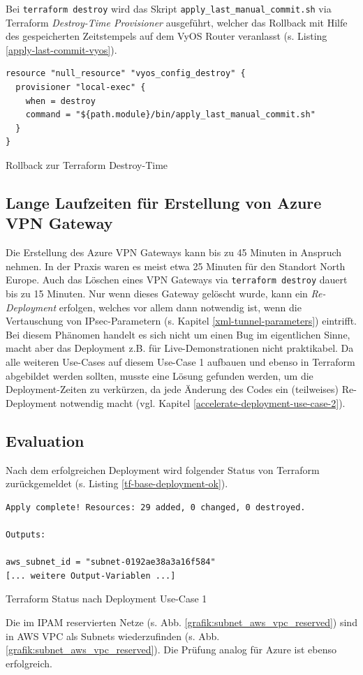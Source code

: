 Bei \texttt{terraform destroy} wird das Skript \texttt{apply\_last\_manual\_commit.sh} via Terraform \textit{Destroy-Time Provisioner} ausgeführt, welcher das Rollback mit Hilfe des gespeicherten Zeitstempels auf dem VyOS Router veranlasst (s. Listing \ref{apply-last-commit-vyos}).
\begin{listing}[h]
\begin{verbatim}
resource "null_resource" "vyos_config_destroy" {
  provisioner "local-exec" {
    when = destroy
    command = "${path.module}/bin/apply_last_manual_commit.sh"
  }
}

\end{verbatim}
\caption{Rollback zur Terraform \glqq Destroy-Time\grqq{}}
\label{apply-last-commit-vyos}
\end{listing}\FloatBarrier
\subsection{Lange Laufzeiten für Erstellung von Azure VPN Gateway}\label{azure-deployment-time}
Die Erstellung des Azure VPN Gateways kann bis zu 45 Minuten in Anspruch nehmen\cite{azurevpndeployment2021}. In der Praxis waren es meist etwa 25 Minuten für den Standort \glqq North Europe\grqq{}. Auch das Löschen eines VPN Gateways via \texttt{terraform destroy} dauert bis zu 15 Minuten. Nur wenn dieses Gateway gelöscht wurde, kann ein \textit{Re-\gls{Deployment}} erfolgen, welches vor allem dann notwendig ist, wenn die Vertauschung von IPsec-Parametern (s. Kapitel \ref{xml-tunnel-parameters}) eintrifft.\\
Bei diesem Phänomen handelt es sich nicht um einen Bug im eigentlichen Sinne, macht aber das \gls{Deployment} z.B. für Live-Demonstrationen nicht praktikabel. Da alle weiteren Use-Cases auf diesem Use-Case 1 aufbauen und ebenso in Terraform abgebildet werden sollten, musste eine Lösung gefunden werden, um die \gls{Deployment}-Zeiten zu verkürzen, da jede Änderung des Codes ein (teilweises) Re-\gls{Deployment} notwendig macht (vgl. Kapitel \ref{accelerate-deployment-use-case-2}).
\subsection{Evaluation}
Nach dem erfolgreichen \gls{Deployment} wird folgender Status von Terraform zurückgemeldet (s. Listing \ref{tf-base-deployment-ok}).
\begin{listing}[h]
\begin{verbatim}
Apply complete! Resources: 29 added, 0 changed, 0 destroyed.

Outputs:

aws_subnet_id = "subnet-0192ae38a3a16f584"
[... weitere Output-Variablen ...]
\end{verbatim}
\caption{Terraform Status nach \gls{Deployment} Use-Case 1}
\label{tf-base-deployment-ok}
\end{listing}\FloatBarrier
Die im IPAM reservierten Netze (s. Abb. \ref{grafik:subnet_aws_vpc_reserved}) sind in AWS VPC als Subnets wiederzufinden (s. Abb. \ref{grafik:subnet_aws_vpc_reserved}). Die Prüfung analog für Azure ist ebenso erfolgreich.

